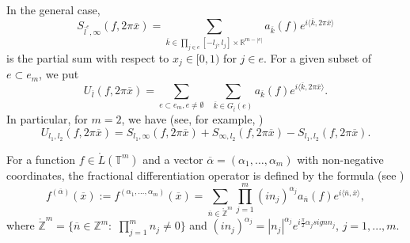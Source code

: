 \documentclass[12pt]{article}
\theoremstyle{plain}
\begin{document}
In the general case, 
\begin{equation*}
S_{\overline{l}^{e}, \infty}(f, 2\pi\overline{x}) =
\sum\limits_{\overline{k} \in \prod_{j \in e} [-l_{j}, l_{j}]\times \mathbb{R}^{m-|e|} }
a_{\overline{k}}(f) e^{i\langle\overline{k} , 2\pi\overline{x}\rangle}
 \end{equation*}
is the partial sum with respect to $x_{j}\in [0, 1)$ for $j\in e.$ 
For a given subset of $e\subset e_{m}$, we put 
\begin{equation*}
U_{\overline{l}}(f, 2\pi\overline{x}) = \sum\limits_{e\subset e_{m}, e \neq \emptyset} \;\; \sum\limits_{\overline{k} \in G_{\overline{l}}(e)} a_{\overline{k} } (f) e^{i\langle\overline{k} ,2\pi\overline{x}\rangle}.
 \end{equation*}
In particular, for $m=2$, we have (see, for example, \cite{6})
 \begin{equation*}
U_{l_{1},l_{2}}(f, 2\pi\overline{x}) = S_{l_{1} ,\infty }(f, 2\pi\overline{x}) + S_{\infty,l_{2}  }(f, 2\pi\overline{x}) - S_{l_{1},l_{2}  }(f, 2\pi\overline{x}).
  \end{equation*}
 
 For a function $f\in \mathring{L}(\mathbb{T}^{m})$ and a vector $\overline{\alpha} = (\alpha_{1}, \ldots , \alpha_{m})$ with non-negative coordinates, the fractional differentiation operator is defined by the formula (see \cite[Chap. 3, Sec. 15]{4}) 
\begin{equation*}
f^{(\overline{\alpha})}(\overline{x}):= f^{(\alpha_{1}, \ldots , \alpha_{m})}(\overline{x}) = \sum_{\overline{n}\in \mathring{\mathbb{Z}}^{m}} \prod_{j=1}^{m}(i n_{j})^{\alpha_{j}}a_{\overline{n}}(f) e^{i\langle\overline{n} , \overline{x}\rangle},
\end{equation*}
where %
 $\mathring{\mathbb{Z}}^{m} = \{\overline{n} \in \mathbb{Z}^{m}: \, \, \prod_{j=1}^{m}n_{j} \neq 0 \}$ and $(i n_{j})^{\alpha_{j}} = |n_{j}|^{\alpha_{j}}e^{i\frac{\pi}{2}\alpha_{j} sign n_{j}}$, $j=1,..., m$.
    
\end{document}
